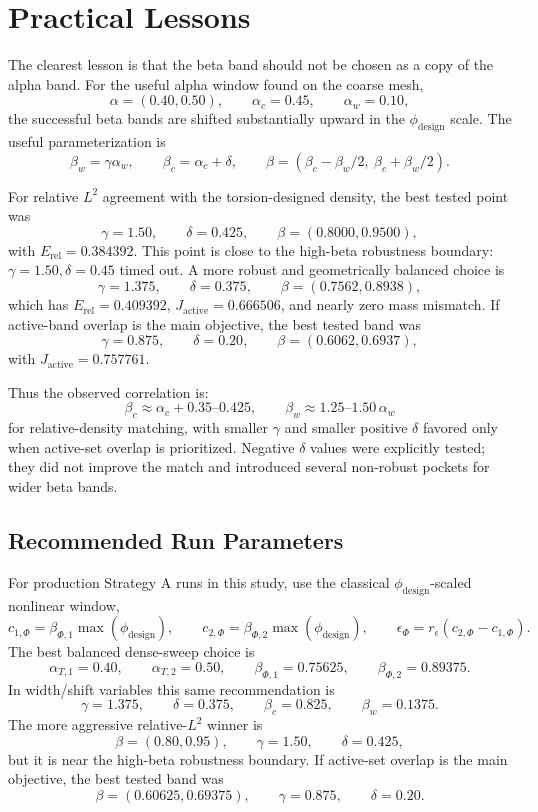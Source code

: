 \documentclass[11pt]{article}
\begin{document}
\section{Practical Lessons}

The clearest lesson is that the beta band should not be chosen as a copy of the
alpha band.  For the useful alpha window found on the coarse mesh,
\[
\alpha=(0.40,0.50),\qquad \alpha_c=0.45,\qquad \alpha_w=0.10,
\]
the successful beta bands are shifted substantially upward in the
\(\phi_{\mathrm{design}}\) scale.  The useful parameterization is
\[
\beta_w=\gamma\alpha_w,\qquad
\beta_c=\alpha_c+\delta,\qquad
\beta=(\beta_c-\beta_w/2,\ \beta_c+\beta_w/2).
\]

For relative \(L^2\) agreement with the torsion-designed density, the best
tested point was
\[
\gamma=1.50,\qquad \delta=0.425,\qquad \beta=(0.8000,0.9500),
\]
with \(E_{\mathrm{rel}}=0.384392\).  This point is close to the high-beta
robustness boundary: \(\gamma=1.50,\delta=0.45\) timed out.  A more robust and
geometrically balanced choice is
\[
\gamma=1.375,\qquad \delta=0.375,\qquad \beta=(0.7562,0.8938),
\]
which has \(E_{\mathrm{rel}}=0.409392\), \(J_{\mathrm{active}}=0.666506\), and
nearly zero mass mismatch.  If active-band overlap is the main objective, the
best tested band was
\[
\gamma=0.875,\qquad \delta=0.20,\qquad \beta=(0.6062,0.6937),
\]
with \(J_{\mathrm{active}}=0.757761\).

Thus the observed correlation is:
\[
\beta_c \approx \alpha_c + 0.35\text{--}0.425,\qquad
\beta_w \approx 1.25\text{--}1.50\,\alpha_w
\]
for relative-density matching, with smaller \(\gamma\) and smaller positive
\(\delta\) favored only when active-set overlap is prioritized.  Negative
\(\delta\) values were explicitly tested; they did not improve the match and
introduced several non-robust pockets for wider beta bands.

\subsection{Recommended Run Parameters}

For production Strategy A runs in this study, use the classical
\(\phi_{\mathrm{design}}\)-scaled nonlinear window,
\[
c_{1,\Phi}=\beta_{\Phi,1}\max(\phi_{\mathrm{design}}),\qquad
c_{2,\Phi}=\beta_{\Phi,2}\max(\phi_{\mathrm{design}}),\qquad
\epsilon_{\Phi}=r_{\epsilon}(c_{2,\Phi}-c_{1,\Phi}).
\]
The best balanced dense-sweep choice is
\[
\alpha_{T,1}=0.40,\qquad
\alpha_{T,2}=0.50,\qquad
\beta_{\Phi,1}=0.75625,\qquad
\beta_{\Phi,2}=0.89375.
\]
In width/shift variables this same recommendation is
\[
\gamma=1.375,\qquad
\delta=0.375,\qquad
\beta_c=0.825,\qquad
\beta_w=0.1375.
\]
The more aggressive relative-\(L^2\) winner is
\[
\beta=(0.80,0.95),\qquad \gamma=1.50,\qquad \delta=0.425,
\]
but it is near the high-beta robustness boundary.  If active-set overlap is
the main objective, the best tested band was
\[
\beta=(0.60625,0.69375),\qquad \gamma=0.875,\qquad \delta=0.20.
\]
\end{document}

